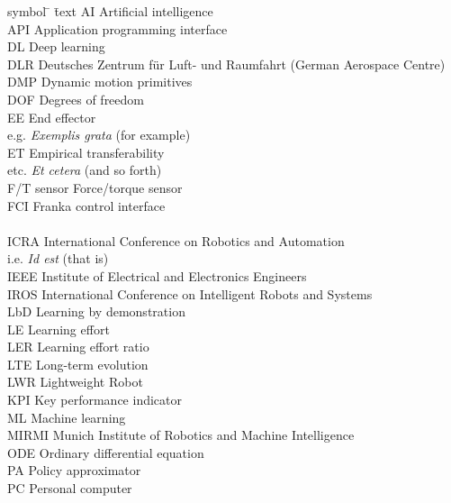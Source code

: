 \begin{tabbing}
symbol \= \hspace{1.5cm} \= text \kill
%
AI \> \> Artificial intelligence \\[1.1ex]
API \> \> Application programming interface \\[1.1ex]
DL \> \> Deep learning \\[1.1ex]
DLR \> \> Deutsches Zentrum f\"ur Luft- und Raumfahrt (German Aerospace Centre) \\[1.1ex]
DMP \> \> Dynamic motion primitives \\[1.1ex]
DOF \> \> Degrees of freedom \\[1.1ex]
EE \> \> End effector \\[1.1ex]
e.g. \> \> \textit{Exemplis grata} (for example) \\[1.1ex]
ET \> \> Empirical transferability \\[1.1ex]
etc. \> \> \textit{Et cetera} (and so forth) \\[1.1ex]
F/T sensor \> \> Force/torque sensor \\[1.1ex]
FCI \> \> Franka control interface \\[1.1ex]
\skillmodelabbr{} \> \> \skillmodelcap{} \\[1.1ex]
ICRA \> \> International Conference on Robotics and Automation \\[1.1ex]
i.e. \> \> \textit{Id est} (that is) \\[1.1ex]
IEEE \> \> Institute of Electrical and Electronics Engineers \\[1.1ex]
IROS \> \> International Conference on Intelligent Robots and Systems \\[1.1ex]
LbD \> \> Learning by demonstration \\[1.1ex]
LE \> \> Learning effort \\[1.1ex]
LER \> \> Learning effort ratio \\[1.1ex]
LTE \> \> Long-term evolution \\[1.1ex]
LWR \> \> Lightweight Robot \\[1.1ex]
KPI \> \> Key performance indicator \\[1.1ex]
ML \> \> Machine learning \\[1.1ex]
MIRMI \> \> Munich Institute of Robotics and Machine Intelligence \\[1.1ex]
ODE \> \> Ordinary differential equation \\[1.1ex]
PA \> \> Policy approximator \\[1.1ex]
PC \> \> Personal computer \\[1.1ex]

\end{tabbing}
